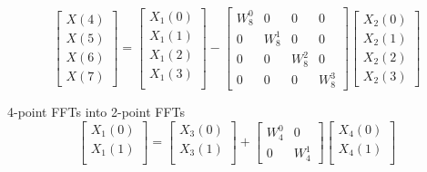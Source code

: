 \documentclass[journal,12pt,twocolumn]{IEEEtran}
\renewcommand\thesection{\arabic{section}}
\begin{document}
\begin{enumerate}[label=\arabic*.,ref=\thesection.\theenumi]
\begin{equation}
\begin{bmatrix}
X(4) \\ 
X(5) \\ 
X(6) \\ 
X(7)
\end{bmatrix}
=
\begin{bmatrix}
X_{1}(0) \\ 
X_{1}(1)\\ 
X_{1}(2)\\
X_{1}(3)\\
\end{bmatrix}
-
\begin{bmatrix}
W^{0}_{8} & 0 & 0 & 0\\
0 & W^{1}_{8} & 0 & 0\\
0 & 0 & W^{2}_{8} & 0\\
0 & 0 & 0 & W^{3}_{8}
\end{bmatrix}
\begin{bmatrix}
X_{2}(0) \\ 
X_{2}(1) \\ 
X_{2}(2) \\
X_{2}(3)
\end{bmatrix}
\end{equation}

4-point FFTs into 2-point FFTs
\begin{equation}
\begin{bmatrix}
X_{1}(0) \\ 
X_{1}(1)\\ 
\end{bmatrix}
=
\begin{bmatrix}
X_{3}(0) \\ 
X_{3}(1)\\ 
\end{bmatrix}
+
\begin{bmatrix}
W^{0}_{4} & 0\\
0 & W^{1}_{4}
\end{bmatrix}
\begin{bmatrix}
X_{4}(0) \\ 
X_{4}(1) \\ 
\end{bmatrix}
\end{equation}


\end{enumerate}
\end{document}
